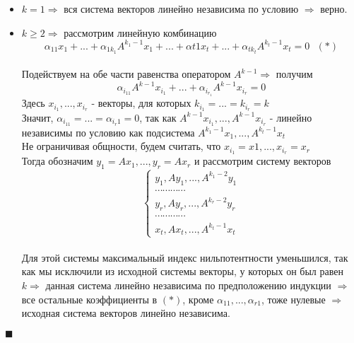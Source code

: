 \documentclass[a4paper,12pt,titlepage,final]{article}
\begin{document}
\begin{itemize}
    \item $k = 1 \Rightarrow$ вся система векторов линейно независима по условию $\Rightarrow$ верно.
    \item $k \geq 2 \Rightarrow$ рассмотрим линейную комбинацию 
    $$\alpha_{11}x_1 + ... + \alpha_{1k_1}A^{k_1 - 1}x_1 + ... + \alpha{t1}x_t + ... + \alpha_{tk_t}A^{k_t - 1}x_t = 0 \text{ $(*)$}$$ \\
    Подействуем на обе части равенства оператором $A^{k - 1} \Rightarrow$ получим
    $$\alpha_{i_11}A^{k - 1}x_{i_1} + ... + \alpha_{i_r_1 }A^{k - 1}x_{i_r} = 0$$ Здесь $x_{i_1}, ... , x_{i_r}$ - 
    векторы, для которых $k_{i_1} = ... = k_{i_r} = k$ \\
    Значит, $\alpha_{i_11} = ... = \alpha_{i_r1} = 0$, так как $A^{k - 1}x_{i_1}, ... , A^{k - 1}x_{i_r}$ - линейно 
    независимы по условию как подсистема $A^{k_1 - 1} x_1, ... , A^{k_t - 1} x_t$ \\
    Не ограничивая общности, будем считать, что $x_{i_1} = x1, ... , x_{i_r} = x_r$ \\
    Тогда обозначим $y_1 = Ax_1, ... , y_r = Ax_r$ и рассмотрим систему векторов 
    $$
    \begin{cases}
        y_1, Ay_1, ... , A^{k_1 - 2} y_1 \\
        \cdots \cdots \cdots \cdots \\
        y_r, Ay_r, ... , A^{k_r - 2}y_r \\
        \cdots \cdots \cdots \cdots \\
        x_t , Ax_t, ... , A^{k_t - 1} x_t
    \end{cases}
    $$ \\
    Для этой системы максимальный индекс нильпотентности уменьшился, так как мы исключили из исходной системы векторы, у которых он был 
    равен $k \Rightarrow$ данная система линейно независима по предположению индукции $\Rightarrow$ все 
    остальные коэффициенты в $(*)$, кроме $\alpha_{11}, ... , \alpha_{r1}$, тоже нулевые $\Rightarrow$ 
    исходная система векторов линейно независима.
\end{itemize}
$\blacksquare$ \\ \\ \\


\end{document}
